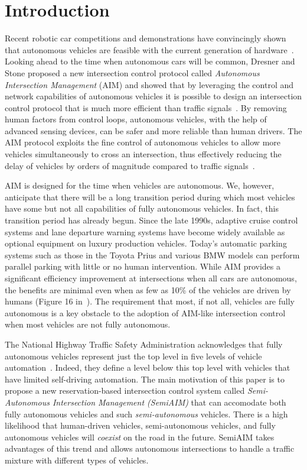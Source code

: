 \section{Introduction}
\label{sec:introduction}

Recent robotic car competitions and demonstrations have convincingly
shown that autonomous vehicles are feasible with the current
generation of hardware~\cite{mybib:Darpa07Urban}. Looking ahead to the
time when autonomous cars will be common, Dresner and Stone proposed a
new intersection control protocol called \emph{Autonomous Intersection
Management} (AIM) and showed that by leveraging the control and
network capabilities of autonomous vehicles it is possible to design
an intersection control protocol that is much more efficient than
traffic signals~\cite{bib:Dresner08Multiagent}.  By removing human
factors from control loops, autonomous vehicles, with the help of
advanced sensing devices, can be safer and more reliable than human
drivers.  The AIM protocol exploits the fine control of autonomous
vehicles to allow more vehicles simultaneously to cross an
intersection, thus effectively reducing the delay of vehicles by
orders of magnitude compared to traffic
signals~\cite{bib:Fajardo12Automated}.

AIM is designed for the time when vehicles are autonomous.  We,
however, anticipate that there will be a long transition period during
which most vehicles have some but not all capabilities of fully
autonomous vehicles.  In fact, this transition period has already
begun. Since the late 1990s, adaptive cruise control systems and lane
departure warning systems have become widely available as optional
equipment on luxury production vehicles.  Today's automatic parking
systems such as those in the Toyota Prius and various BMW models can
perform parallel parking with little or no human intervention.  While
AIM provides a significant efficiency improvement at intersections
when all cars are autonomous, the benefits are minimal even when as
few as 10\% of the vehicles are driven by humans (Figure 16
in~\cite{bib:Dresner08Multiagent}).  The requirement that most, if not
all, vehicles are fully autonomous is a key obstacle to the adoption
of AIM-like intersection control when most vehicles are not fully
autonomous.

The National Highway Traffic Safety Administration acknowledges that
fully autonomous vehicles represent just the top level in five levels
of vehicle automation~\cite{bib:NHTSA13Preliminary}. Indeed, they
define a level below this top level with vehicles that have limited
self-driving automation.  The main motivation of this paper is to
propose a new reservation-based intersection control system called
\emph{Semi-Autonomous Intersection Management (SemiAIM)} that can
accomodate both fully autonomous vehicles and such
\emph{semi-autonomous} vehicles. There is a high likelihood that
human-driven vehicles, semi-autonomous vehicles, and fully autonomous
vehicles will \emph{coexist} on the road in the future.  SemiAIM takes
advantages of this trend and allows autonomous intersections to handle
a traffic mixture with different types of vehicles.

